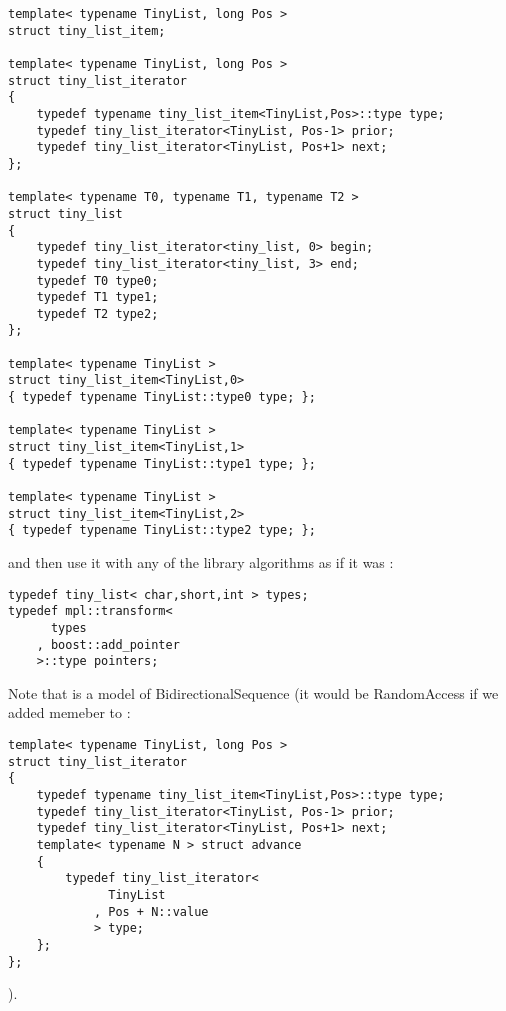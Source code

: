 \documentclass{netobjectdays}
\begin{document}
{\footnotesize
\begin{verbatim}
template< typename TinyList, long Pos >
struct tiny_list_item;

template< typename TinyList, long Pos >
struct tiny_list_iterator
{
    typedef typename tiny_list_item<TinyList,Pos>::type type;
    typedef tiny_list_iterator<TinyList, Pos-1> prior;
    typedef tiny_list_iterator<TinyList, Pos+1> next;
};

template< typename T0, typename T1, typename T2 >
struct tiny_list
{
    typedef tiny_list_iterator<tiny_list, 0> begin;
    typedef tiny_list_iterator<tiny_list, 3> end;
    typedef T0 type0;
    typedef T1 type1;
    typedef T2 type2;
};

template< typename TinyList >
struct tiny_list_item<TinyList,0>
{ typedef typename TinyList::type0 type; };

template< typename TinyList >
struct tiny_list_item<TinyList,1>
{ typedef typename TinyList::type1 type; };

template< typename TinyList >
struct tiny_list_item<TinyList,2>
{ typedef typename TinyList::type2 type; };
\end{verbatim}
}

and then use it with any of the library algorithms as if it 
was :

{\footnotesize
\begin{verbatim}
typedef tiny_list< char,short,int > types;
typedef mpl::transform<
      types
    , boost::add_pointer
    >::type pointers;
\end{verbatim}
}

Note that  is a model of 
BidirectionalSequence (it would be RandomAccess if 
we added  memeber to :

{\footnotesize
\begin{verbatim}
template< typename TinyList, long Pos >
struct tiny_list_iterator
{
    typedef typename tiny_list_item<TinyList,Pos>::type type;
    typedef tiny_list_iterator<TinyList, Pos-1> prior;
    typedef tiny_list_iterator<TinyList, Pos+1> next;
    template< typename N > struct advance
    {
        typedef tiny_list_iterator<
              TinyList
            , Pos + N::value
            > type;
    };
};
\end{verbatim}
}

).
\end{document}
